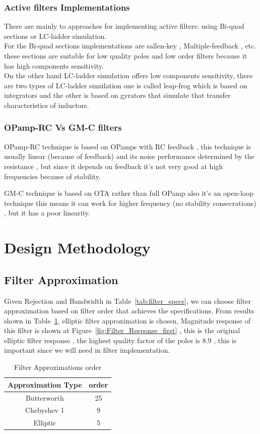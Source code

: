 \subsubsection{Active filters Implementations}%
There are mainly to approaches for implementing active filters:
using Bi-quad sections or LC-ladder simulation.\\
For the Bi-quad sections implementations are sallen-key ,
Multiple-feedback , etc. these sections are suitable for low 
quality poles and low order filters because it has high components
sensitivity. \\
On the other hand LC-ladder simulation offers low components 
sensitivity, there are two types of LC-ladder simulation one
is called leap-frog which is based on integrators and the other
is based on gyrators that simulate that transfer characteristics of
inductors.

\subsubsection{OPamp-RC Vs GM-C filters}%
OPamp-RC technique is based on OPamps with RC feedback , this 
technique is usually linear (because of feedback) and its noise
performance determined by the resistance , but since it depends
on feedback it's not very good at high frequencies because of 
stability.

GM-C technique is based on OTA rather than full OPamp also it's 
an open-loop technique this means it can work for higher frequency
(no stability consecrations) , but it has a poor linearity.
\cite{Saari2012_ch3}

\section{Design Methodology}%
\subsection{Filter Approximation}%
Given Rejection and Bandwidth in Table~\ref{tab:filter_specs},
we can choose filter approximation based on filter order that
achieves the specifications, 
From results shown in Table~\ref{tab:filter_approx_tabel}, elliptic
filter approximation is chosen, Magnitude response of this 
filter is shown at Figure~\ref{fig:Filter_Response_first} , this
is the original elliptic filter response  , the highest quality
factor of the poles is 8.9 , this is important since we will need
in filter implementation.
\begin{table}[htpb]
    \centering
    \caption{Filter Approximations order}
    \label{tab:filter_approx_tabel}

    \begin{tabular}{|c|c|}
        \hline
        Approximation Type & order  \\ \hline
        Butterworth & 25 \\ \hline
        Chebyshev 1 & 9 \\ \hline
        Elliptic & 5 \\ \hline
    \end{tabular}
\end{table}

